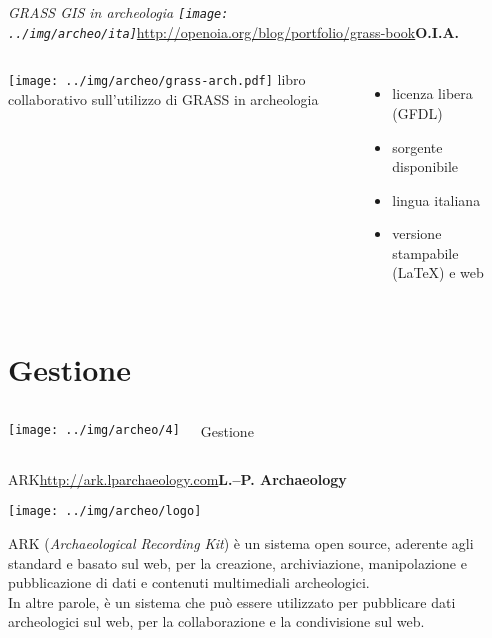 \documentclass[xcolor=svgnames]{beamer}
\begin{document}

		\begin{frame}{\textit{GRASS GIS in archeologia\hfill
			\texttt{[image: ../img/archeo/ita]}}}{\url{http://openoia.org/blog/portfolio/grass-book}\hfill\small{\textbf{O.I.A.}}}
			\begin{columns}[c]
						\texttt{[image: ../img/archeo/grass-arch.pdf]}
					libro collaborativo sull'utilizzo di GRASS in archeologia		
					\begin{itemize}
						\item licenza libera (GFDL)
						\item sorgente disponibile
						\item lingua italiana
						\item versione stampabile (\LaTeX) e web
					\end{itemize}
			\end{columns}
		\end{frame}

	\section{Gestione}

		\begin{frame}
			\begin{columns}[c]
					\begin{center}
						\texttt{[image: ../img/archeo/4]}
					\end{center}
					\Huge Gestione
			\end{columns}
		\end{frame}


		\begin{frame}{ARK}{\url{http://ark.lparchaeology.com}\hfill\small{\textbf{L.--P. Archaeology}}}
			\begin{center}
				\texttt{[image: ../img/archeo/logo]}
			\end{center}

			ARK (\emph{Archaeological Recording Kit}) è un sistema open source, aderente agli standard e basato sul web, per la creazione, archiviazione, manipolazione e pubblicazione di dati e contenuti multimediali archeologici.\\

			In altre parole, è un sistema che può essere utilizzato per pubblicare dati archeologici sul web, per la collaborazione e la condivisione sul web.
		\end{frame}
\end{document}
